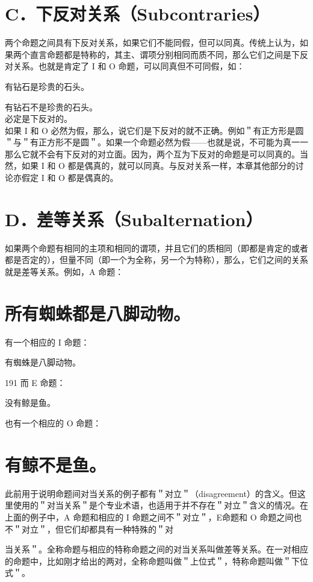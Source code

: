 \section*{C．下反对关系（Subcontraries）}
两个命题之间具有下反对关系，如果它们不能同假，但可以同真。传统上认为，如果两个直言命题都是特称的，其主、谓项分别相同而质不同，那么它们之间是下反对关系。也就是肯定了 I 和 O 命题，可以同真但不可同假，如：

有钻石是珍贵的石头。

有钻石不是珍贵的石头。\\
必定是下反对的。\\
如果 I 和 O 必然为假，那么，说它们是下反对的就不正确。例如＂有正方形是圆＂与＂有正方形不是圆＂。如果一个命题必然为假——也就是说，不可能为真一一那么它就不会有下反对的对立面。因为，两个互为下反对的命题是可以同真的。当然，如果 I 和 O 都是偶真的，就可以同真。与反对关系一样，本章其他部分的讨论亦假定 I 和 O 都是偶真的。

\section*{D．差等关系（Subalternation）}
如果两个命题有相同的主项和相同的谓项，并且它们的质相同（即都是肯定的或者都是否定的），但量不同（即一个为全称，另一个为特称），那么，它们之间的关系就是差等关系。例如，A 命题：

\section*{所有蜘蛛都是八脚动物。}
有一个相应的 I 命题：

有蜘蛛是八脚动物。

191 而 E 命题：

\begin{displayquote}
没有鲸是鱼。
\end{displayquote}

也有一个相应的 O 命题：

\section*{有鲸不是鱼。}
此前用于说明命题间对当关系的例子都有＂对立＂（disagreement）的含义。但这里使用的＂对当关系＂是个专业术语，也适用于并不存在＂对立＂含义的情况。在上面的例子中，A 命题和相应的 I 命题之间不＂对立＂，E命题和 O 命题之间也不＂对立＂，但它们却都具有一种特殊的＂对

当关系＂。全称命题与相应的特称命题之间的对当关系叫做差等关系。在一对相应的命题中，比如刚才给出的两对，全称命题叫做＂上位式＂，特称命题叫做＂下位式＂。


